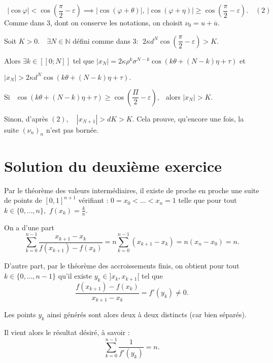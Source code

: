 \begin{enumerate}
  $ \:\:|\cos \varphi |< \cos(\dfrac{\pi}2 - \varepsilon) \implies |\cos (\varphi + \theta)|, \:|\cos(\varphi + \eta) |\geqslant \cos(\dfrac {\pi}2 - \varepsilon). \quad(2)$    
  Comme dans $3$, dont on conserve les notations, on choisit $ \nu_0 = u + \overline u$. 
  
  Soit $K>0. \quad \exists N \in \mathbb N$ défini comme dans $3: \:\: 2 \kappa d^{N} \cos (\dfrac {\pi}2 - \varepsilon) >K.$
  
  Alors $\exists k \in [\![0;N]\!]$ tel que 
  $|x_N|= 2\kappa \rho ^k \sigma^{N-k} \cos \left( k\theta + (N-k) \eta + \tau \right) $ et 
  
  $|x_N|>2 \kappa d ^{N} \cos\left( k\theta + (N-k) \eta + \tau \right).$
  
  Si $ \:\:\cos\left(k \theta +(N-k) \eta +\tau \right) \geqslant \cos(\dfrac {\Pi}2 - \varepsilon),\:\:$ alors $|x_N|>K.$
  
  Sinon, d'après $ (2),  \quad |x_{N+1}| >d  K>K.$  
  Cela prouve, qu'encore une fois, la suite $(\nu_n) _n$  n'est pas bornée.
  
  \end{enumerate}
\section{Solution du deuxième exercice}

Par le théorème des valeurs intermédiaires, il existe de proche en proche une suite de points de $[0,1]^{n+1}$ vérifiant : $0=x_{0}<\ldots<x_{n}=1$ telle que pour tout $k\in\{0,\ldots,n\},$ $\displaystyle f(x_{k})=\frac{k}{n}.$

On a d'une part $$\sum_{k=0}^{n-1}\frac{x_{k+1}-x_{k}}{f(x_{k+1})-f(x_{k})}=n\sum_{k=0}^{n-1}\left(x_{k+1}-x_{k}\right)=n(x_{n}-x_{0})=n.$$

D'autre part, par le théorème des accroissements finis, on obtient pour tout $k\in\{0,\ldots,n-1\}$ qu'il existe $y_{k}\in ]x_{k},x_{k+1}[$ tel que $$\frac{f(x_{k+1})-f(x_{k})}{x_{k+1}-x_{k}}=f'(y_{k})\neq 0.$$

Les points $y_{k}$ ainsi générés sont alors deux à deux distincts (car bien séparés).

Il vient alors le résultat désiré, à savoir : $$\sum_{k=0}^{n-1}\frac{1}{f'(y_{k})}=n.$$